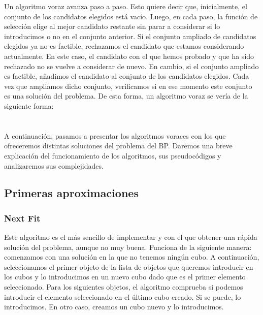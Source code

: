 \documentclass[a4paper, 12pt, oneside]{book}
\begin{document}
	Un algoritmo voraz avanza paso a paso. Esto quiere decir que, inicialmente,
	el conjunto de los candidatos elegidos est\'a vac\'io. Luego, en cada paso, la funci\'on de selecci\'on elige al mejor candidato restante sin parar a considerar si lo introducimos o no en el conjunto anterior. Si el conjunto ampliado de candidatos elegidos ya no es factible, rechazamos el candidato que estamos considerando actualmente. En este caso, el candidato con el que hemos probado y que ha sido rechazado no se vuelve a considerar de nuevo. En cambio, si el conjunto ampliado es factible, a\~{n}adimos el candidato al conjunto de los candidatos elegidos. Cada vez que ampliamos dicho conjunto, verificamos si en ese momento este conjunto es una soluci\'on del problema. De esta forma, un algoritmo voraz se ver\'ia de la siguiente forma:
	\\
	
	\noindent{}
	\\\\
	
	A continuaci\'on, pasamos a presentar los algoritmos voraces con los que ofreceremos distintas soluciones del problema del BP. Daremos una breve explicaci\'on del funcionamiento de los algoritmos, sus pseudoc\'odigos y analizaremos sus complejidades. 
	
	
	\subsection{Primeras aproximaciones}
	\subsubsection{Next Fit}
	Este algoritmo es el m\'as sencillo de implementar y con el que obtener una r\'apida soluci\'on del problema, aunque no muy buena. Funciona de la siguiente manera: comenzamos con una soluci\'on en la que no tenemos ning\'un cubo. A continuaci\'on, seleccionamos el primer objeto de la lista de objetos que queremos introducir en los cubos y lo introducimos en un nuevo cubo dado que es el primer elemento seleccionado. Para los siguientes objetos, el algoritmo comprueba si podemos introducir el elemento seleccionado en el \'ultimo cubo creado. Si se puede, lo introducimos. En otro caso, creamos un cubo nuevo y lo introducimos.
	\\
	
\end{document}
